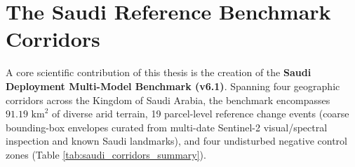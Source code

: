 \section{The Saudi Reference Benchmark Corridors}
\label{sec:data_saudi_benchmark}
A core scientific contribution of this thesis is the creation of the \textbf{Saudi Deployment Multi-Model Benchmark (v6.1)}. Spanning four geographic corridors across the Kingdom of Saudi Arabia, the benchmark encompasses \textbf{$91.19\text{ km}^2$} of diverse arid terrain, 19 parcel-level reference change events (coarse bounding-box envelopes curated from multi-date Sentinel-2 visual/spectral inspection and known Saudi landmarks), and four undisturbed negative control zones (Table \ref{tab:saudi_corridors_summary}).

\begin{table}[htbp]
\centering
\caption{Saudi Reference Evaluation Corridors Summary Specification.}
\label{tab:saudi_corridors_summary}
\end{table}

